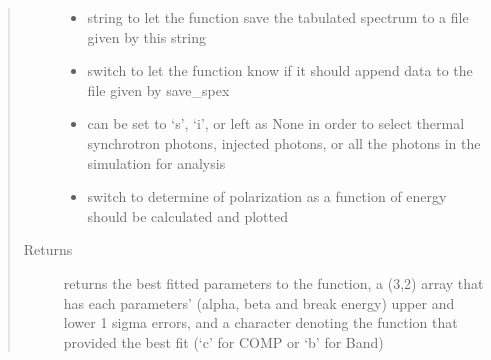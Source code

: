 \documentclass[letterpaper,10pt,english]{sphinxmanual}
\begin{document}
\begin{fulllineitems}
\begin{quote}
\begin{description}
\begin{itemize}
\item {} 
 \textendash{} string to let the function save the tabulated spectrum to a file given by this string

\item {} 
 \textendash{} switch to let the function know if it should append data to the file given by save\_spex

\item {} 
 \textendash{} can be set to ‘s’, ‘i’, or left as None in order to select thermal synchrotron photons, injected photons, or all the photons in the simulation for analysis

\item {} 
 \textendash{} switch to determine of polarization as a function of energy should be calculated and plotted

\end{itemize}

\item[{Returns}] \leavevmode
returns the best fitted parameters to the function, a (3,2) array that has each parameters’ (alpha, beta
and break energy) upper and lower 1 sigma errors, and a character denoting the function that provided the best fit (‘c’ for
COMP or ‘b’ for Band)

\end{description}\end{quote}

\end{fulllineitems}

\end{document}
